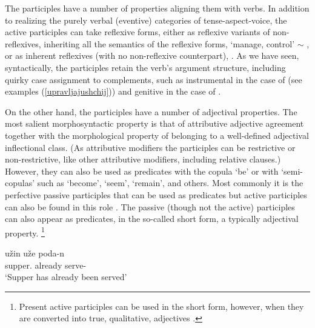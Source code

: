 \documentclass[output=paper,
modfonts
]{LSP/langsci}
\begin{document}
\begin{sloppypar}%
The participles have a number of properties aligning them with verbs. In addition to  realizing the purely verbal (eventive) categories of tense-aspect-voice, the active participles can take reflexive forms, either as reflexive variants of non-reflexives, inheriting all the semantics of the reflexive forms,  ‘manage, control’ $\sim$ , or as inherent reflexives (with no non-reflexive counterpart), . As we have seen, syntactically, the participles retain the verb’s argument structure, including quirky case assignment to complements, such as instrumental in the case of 
 (see examples (\ref{upravljajushchij})) and genitive in the case of .
\end{sloppypar}%

\begin{sloppypar}%
On the other hand, the participles have a number of adjectival properties. The most  salient morphosyntactic property is that of attributive adjective agreement together with the morphological property of belonging to a well-defined adjectival inflectional class. (As attributive modifiers the participles can be restrictive or non-restrictive, like other attributive modifiers, including relative clauses.) However, they can also be used as predicates with the copula  ‘be’ or with ‘semi-copulas’ such as  ‘become’,  ‘seem’,   ‘remain’, and others. Most commonly it is the perfective passive participles that can be used as predicates but active participles can also be found in this role \parencite[p. 291, \S2346]{RussGramm80-II}. The passive (though not the active) participles can also appear as predicates, in the so-called short form, a typically adjectival property.%
\footnote%
{Present active participles can be used in the short form, however, when they are converted into true, qualitative, adjectives \parencite[666]{RussGramm80-I}.
}
\end{sloppypar}%


\begin{exe} \ex	\label{podan}

\gll	užin uže poda-n\\
	supper.	already 	serve-\\
\glt	‘Supper has already been served’
\end{exe}
  
\end{document}

